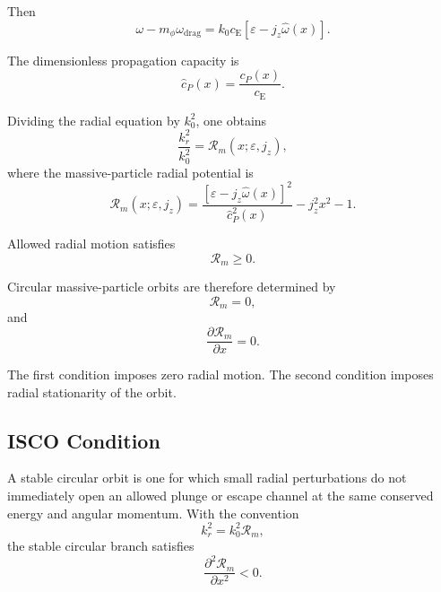 Then
\begin{equation}
    \omega - m_{\phi}\omega_{\mathrm{drag}} = k_0 c_{\mathrm{E}} \left[ \varepsilon - j_z\widehat{\omega}(x) \right].
\end{equation}

The dimensionless propagation capacity is
\begin{equation}
    \widehat{c}_P(x) = \frac{c_P(x)}{c_{\mathrm{E}}}.
\end{equation}

Dividing the radial equation by $k_0^2$, one obtains
\begin{equation}
    \frac{k_r^2}{k_0^2} = \mathcal{R}_m(x;\varepsilon,j_z),
\end{equation}
where the massive-particle radial potential is
\begin{equation}
    \boxed{ \mathcal{R}_m(x;\varepsilon,j_z) = \frac{ \left[ \varepsilon - j_z\widehat{\omega}(x) \right]^2 }{ \widehat{c}_P^2(x) } - j_z^2x^2 - 1. }
\end{equation}

Allowed radial motion satisfies
\begin{equation}
    \mathcal{R}_m \geq 0.
\end{equation}

Circular massive-particle orbits are therefore determined by
\begin{equation}
    \mathcal{R}_m = 0,
\end{equation}
and
\begin{equation}
    \frac{\partial \mathcal{R}_m}{\partial x} = 0.
\end{equation}

The first condition imposes zero radial motion. The second condition imposes radial stationarity of the orbit.

\subsection{ISCO Condition}

A stable circular orbit is one for which small radial perturbations do not immediately open an allowed plunge or escape channel at the same conserved energy and angular momentum. With the convention
\begin{equation}
    k_r^2 = k_0^2\mathcal{R}_m,
\end{equation}
the stable circular branch satisfies
\begin{equation}
    \frac{\partial^2\mathcal{R}_m}{\partial x^2} < 0.
\end{equation}

